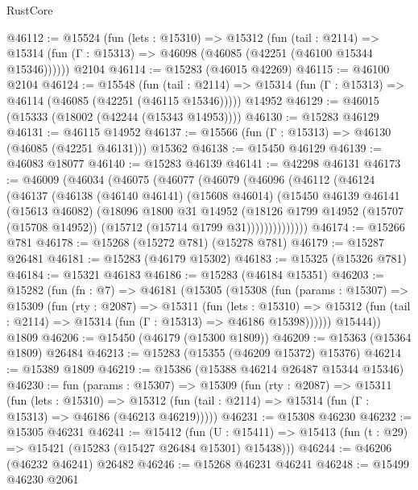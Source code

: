 \begin{lexlean}{RustCore}
\begin{coremodule}
@46112 := @15524
    (fun (lets : @15310) =>
    @15312
      (fun (tail : @2114) =>
      @15314 (fun (Γ : @15313) => @46098 (@46085 (@42251 (@46100 @15344 @15346))))))
    @2104
@46114 := @15283 (@46015 @42269)
@46115 := @46100 @2104
@46124 := @15548
    (fun (tail : @2114) => @15314 (fun (Γ : @15313) => @46114 (@46085 (@42251 (@46115 @15346)))))
    @14952
@46129 := @46015 (@15333 (@18002 (@42244 (@15343 @14953))))
@46130 := @15283 @46129
@46131 := @46115 @14952
@46137 := @15566 (fun (Γ : @15313) => @46130 (@46085 (@42251 @46131))) @15362
@46138 := @15450 @46129
@46139 := @46083 @18077
@46140 := @15283 @46139
@46141 := @42298 @46131
@46173 := @46009
    (@46034
      (@46075
        (@46077
          (@46079
            (@46096
              (@46112
                (@46124
                  (@46137
                    (@46138
                      (@46140 @46141)
                      (@15608 @46014)
                      (@15450
                        @46139
                        @46141
                        (@15613 @46082)
                        (@18096
                          @1800
                          @31
                          @14952
                          (@18126
                            @1799
                            @14952
                            (@15707 (@15708 @14952))
                            (@15712 (@15714 @1799 @31))))))))))))))
@46174 := @15266 @781
@46178 := @15268 (@15272 @781) (@15278 @781)
@46179 := @15287 @26481
@46181 := @15283 (@46179 @15302)
@46183 := @15325 (@15326 @781)
@46184 := @15321 @46183
@46186 := @15283 (@46184 @15351)
@46203 := @15282
    (fun (fn : @7) =>
    @46181
      (@15305
        (@15308
          (fun (params : @15307) =>
          @15309
            (fun (rty : @2087) =>
            @15311
              (fun (lets : @15310) =>
              @15312 (fun (tail : @2114) => @15314 (fun (Γ : @15313) => @46186 @15398))))))
        @15444))
    @1809
@46206 := @15450 (@46179 (@15300 @1809))
@46209 := @15363 (@15364 @1809) @26484
@46213 := @15283 (@15355 (@46209 @15372) @15376)
@46214 := @15389 @1809
@46219 := @15386 (@15388 @46214 @26487 @15344 @15346)
@46230 := fun (params : @15307) =>
  @15309
    (fun (rty : @2087) =>
    @15311
      (fun (lets : @15310) =>
      @15312 (fun (tail : @2114) => @15314 (fun (Γ : @15313) => @46186 (@46213 @46219)))))
@46231 := @15308 @46230
@46232 := @15305 @46231
@46241 := @15412
    (fun (U : @15411) => @15413 (fun (t : @29) => @15421 (@15283 (@15427 @26484 @15301) @15438)))
@46244 := @46206 (@46232 @46241) @26482
@46246 := @15268 @46231 @46241
@46248 := @15499 @46230 @2061

\end{coremodule}
\end{lexlean}
